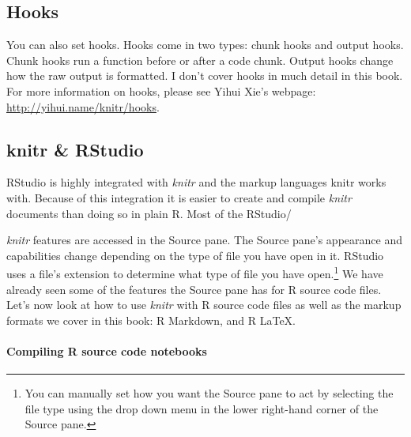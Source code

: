 {\begin{knitrout}
\color{fgcolor}
\end{knitrout}


\subsection{Hooks}

You can also set hooks. Hooks come in two types: chunk hooks and output hooks. Chunk hooks run a function before or after a code chunk. Output hooks change how the raw output is formatted. I don't cover hooks in much detail in this book. For more information on hooks, please see Yihui Xie's webpage: \url{http://yihui.name/knitr/hooks}.

\subsection{knitr \& RStudio}

RStudio is highly integrated with {\emph{knitr}} and the markup languages knitr works with. Because of this integration it is easier to create and compile {\emph{knitr}} documents than doing so in plain R. Most of the RStudio/{\emph{knitr} features are accessed in the Source pane. The Source pane's appearance and capabilities change depending on the type of file you have open in it. RStudio uses a file's extension to determine what type of file you have open.\footnote{You can manually set how you want the Source pane to act by selecting the file type using the drop down menu in the lower right-hand corner of the Source pane.} We have already seen some of the features the Source pane has for R source code files. Let's now look at how to use {\emph{knitr}} with R source code files as well as the markup formats we cover in this book: R Markdown, and R LaTeX. \\[0.25cm]

\paragraph{Compiling R source code notebooks}

}}
